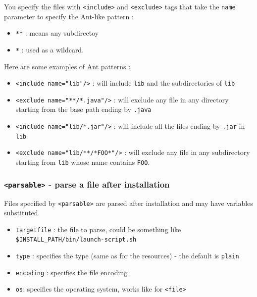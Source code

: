 You specify the files with  \texttt{<include>} and \texttt{<exclude>} tags
that take the \texttt{name} parameter to specify the Ant-like pattern :
\begin{itemize}    
  \item \texttt{**} : means any subdirectoy
  \item \texttt{*} : used as a wildcard.
\end{itemize}
Here are some examples of Ant patterns :
\begin{itemize}

  \item \texttt{<include name="lib"/>} : will include \texttt{lib} and the
  subdirectories of \texttt{lib}

  \item \texttt{<exclude name="**/*.java"/>} : will exclude any file in any
  directory starting from the base path ending by \texttt{.java}

  \item \texttt{<include name="lib/*.jar"/>} : will include all the files
  ending by \texttt{.jar} in \texttt{lib}

  \item \texttt{<exclude name="lib/**/*FOO*"/>} : will exclude any file in
  any subdirectory starting from \texttt{lib} whose name contains
  \texttt{FOO}.

\end{itemize}

\subsubsection{\texttt{<parsable>} - parse a file after installation}

Files specified by \texttt{<parsable>} are parsed after installation and may
have variables substituted.

\begin{itemize}

  \item \texttt{targetfile} : the file to parse, could be something like\\
  \texttt{\$INSTALL\_PATH/bin/launch-script.sh}

  \item \texttt{type} : specifies the type (same as for the resources) -
  the default is \texttt{plain}

  \item \texttt{encoding} : specifies the file encoding

  \item \texttt{os}: specifies the operating system, works like for
  \texttt{<file>}

\end{itemize}\

